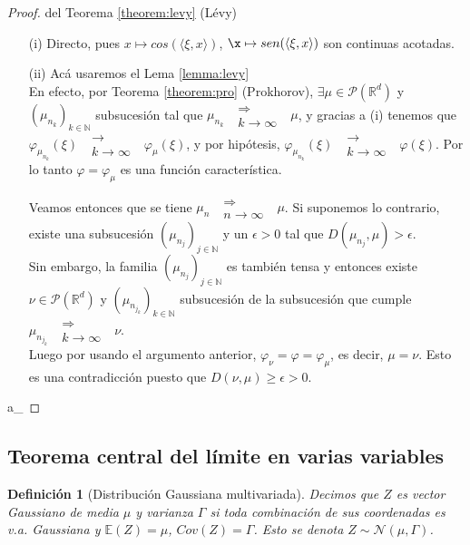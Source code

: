 \documentclass[letterpaper,11pt]{article} %
\theoremstyle{defbreak}
\newtheorem{definition}{Definición}[subsection]
\theoremstyle{propbreak}
\theoremstyle{remark}
\theoremstyle{break}
\def\R{\mathbb{R}}
\def\N{\mathbb{N}}
\def\convdebil{\mbox{ }\substack{\Longrightarrow \\n \to \infty}\mbox{ }}
\def\gris{\color{mygray}}
\def\negro{\color{black}}
\def\findem{\null\hfill\color{white}a\color{black}_\square}
\begin{document}
\begin{proof} del Teorema \ref{theorem:levy} (Lévy)
\gris
\begin{itemize}
    \item[(i)] Directo, pues $x\mapsto cos(\langle\xi,x\rangle)$, $\x\mapsto sen(\langle\xi,x\rangle)$ son continuas acotadas.
    \item[(ii)] Acá usaremos el Lema \ref{lemma:levy}
    \\ En efecto, por Teorema \ref{theorem:pro} (Prokhorov), $\exists\mu\in\mathcal{P}(\R^d)$ y $(\mu_{n_k})_{k\in\N}$ subsucesión tal que $\mu_{n_k}\mbox{ }\substack{\Longrightarrow \\k \to \infty}\mbox{ }\mu$, y gracias a (i) tenemos que $\varphi_{\mu_{n_k}}(\xi)\mbox{ }\substack{\longrightarrow \\k \to \infty}\mbox{ }\varphi_{\mu}(\xi)$, y por hipótesis, $\varphi_{\mu_{n_k}}(\xi)\mbox{ }\substack{\longrightarrow \\k \to \infty}\mbox{ }\varphi(\xi)$.
    Por lo tanto $\varphi=\varphi_\mu$ es una función característica.
    
    Veamos entonces que se tiene $\mu_n\convdebil\mu$. Si suponemos lo contrario, existe una subsucesión $(\mu_{n_j})_{j\in\N}$ y un $\epsilon>0$ tal que $D(\mu_{n_j},\mu)>\epsilon$.
    \\Sin embargo, la familia $(\mu_{n_j})_{j\in\N}$ es también tensa y entonces existe $\nu\in\mathcal{P}(\R^d)$ y $(\mu_{n_{j_k}})_{k\in\N}$ subsucesión de la subsucesión que cumple $\mu_{n_{j_k}}\mbox{ }\substack{\Longrightarrow \\k \to \infty}\mbox{ }\nu$.
    \\ Luego por usando el argumento anterior, $\varphi_\nu=\varphi=\varphi_\mu$, es decir, $\mu=\nu$. Esto es una contradicción puesto que $D(\nu,\mu)\geq\epsilon>0$.
\end{itemize}
\findem
\negro 
\end{proof}

\subsection{Teorema central del límite en varias variables} %
\begin{definition}[Distribución Gaussiana multivariada]
\label{gauss}
Decimos que $Z$ es vector Gaussiano de media $\mu$ y varianza $\Gamma$ si toda combinación de sus coordenadas es v.a. Gaussiana y $\mathbb{E}(Z)=\mu$, $Cov(Z)=\Gamma$. Esto se denota $Z\sim\mathcal{N}(\mu,\Gamma)$.
\end{definition}
\end{document}
